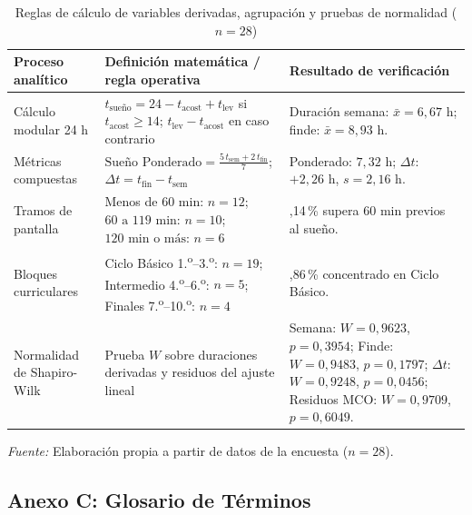 \documentclass[12pt, letterpaper]{article}
\begin{document}
\begin{table}[H]
\centering
\caption{Reglas de cálculo de variables derivadas, agrupación y pruebas de normalidad \mbox{($n = 28$)}}
\label{tab:a2}
\scriptsize
\begin{tabularx}{\textwidth}{>{\raggedright\arraybackslash}p{2.9cm}>{\raggedright\arraybackslash}p{5.8cm}>{\raggedright\arraybackslash}X}
\toprule
\textbf{Proceso analítico} & \textbf{Definición matemática / regla operativa} & \textbf{Resultado de verificación} \\
\midrule
Cálculo modular 24 h & $t_{\text{sueño}} = 24 - t_{\text{acost}} + t_{\text{lev}}$ si $t_{\text{acost}} \ge 14$; $t_{\text{lev}} - t_{\text{acost}}$ en caso contrario & Duración semana: $\bar{x} = 6{,}67\text{ h}$; finde: $\bar{x} = 8{,}93\text{ h}$. \\
\addlinespace
Métricas compuestas & $\text{Sueño Ponderado} = \frac{5\,t_{\text{sem}} + 2\,t_{\text{fin}}}{7}$; $\Delta t = t_{\text{fin}} - t_{\text{sem}}$ & Ponderado: $7{,}32\text{ h}$; $\Delta t$: $+2{,}26\text{ h}$, $s = 2{,}16\text{ h}$. \\
\addlinespace
Tramos de pantalla & Menos de $60\text{ min}$: $n=12$; $60\text{ a }119\text{ min}$: $n=10$; $120\text{ min o más}$: $n=6$ & 57,14\,\% supera $60\text{ min}$ previos al sueño. \\
\addlinespace
Bloques curriculares & Ciclo Básico 1.\textsuperscript{o}--3.\textsuperscript{o}: $n=19$; Intermedio 4.\textsuperscript{o}--6.\textsuperscript{o}: $n=5$; Finales 7.\textsuperscript{o}--10.\textsuperscript{o}: $n=4$ & 67,86\,\% concentrado en Ciclo Básico. \\
\addlinespace
Normalidad de Shapiro-Wilk & Prueba $W$ sobre duraciones derivadas y residuos del ajuste lineal & Semana: $W = 0{,}9623$, $p = 0{,}3954$; Finde: $W = 0{,}9483$, $p = 0{,}1797$; $\Delta t$: $W = 0{,}9248$, $p = 0{,}0456$; Residuos MCO: $W = 0{,}9709$, $p = 0{,}6049$. \\
\bottomrule
\end{tabularx}
\par\smallskip\parbox{\textwidth}{\footnotesize\textit{Fuente:} Elaboración propia a partir de datos de la encuesta ($n = 28$).}
\end{table}


\subsection{Anexo C: Glosario de Términos}
\end{document}

